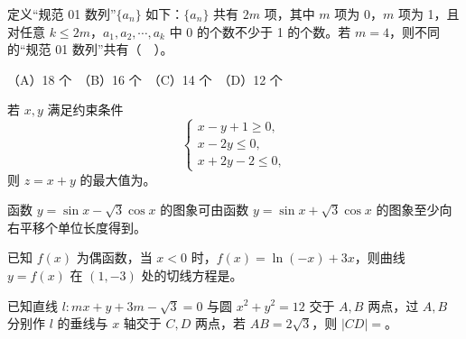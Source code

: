 \begin{question}
定义“规范 01 数列”\(\{a_n\}\) 如下：\(\{a_n\}\) 共有 \(2m\) 项，其中 \(m\) 项为 0，\(m\) 项为 1，且对任意 \(k\leq 2m\)，\(a_1,a_2,\cdots,a_k\) 中 0 的个数不少于 1 的个数。若 \(m=4\)，则不同的“规范 01 数列”共有（　）。

（A）18 个　（B）16 个　（C）14 个　（D）12 个

\end{question}

\begin{question}
若 \(x,y\) 满足约束条件
\nopagebreak[4]
\[
\begin{cases}
x-y+1\geq0,\\
x-2y\leq0,\\
x+2y-2\leq0,
\end{cases}
\]
则 \(z=x+y\) 的最大值为\gkblank{}。

\end{question}
\begin{question}
函数 \(y=\sin x-\sqrt3\cos x\) 的图象可由函数 \(y=\sin x+\sqrt3\cos x\) 的图象至少向右平移\gkblank{}个单位长度得到。

\end{question}
\begin{question}
已知 \(f(x)\) 为偶函数，当 \(x<0\) 时，\(f(x)=\ln(-x)+3x\)，则曲线 \(y=f(x)\) 在 \((1,-3)\) 处的切线方程是\gkblank{}。

\end{question}
\begin{question}
已知直线 \(l:mx+y+3m-\sqrt3=0\) 与圆 \(x^2+y^2=12\) 交于 \(A,B\) 两点，过 \(A,B\) 分别作 \(l\) 的垂线与 \(x\) 轴交于 \(C,D\) 两点，若 \(AB=2\sqrt3\)，则 \(|CD|=\)\gkblank{}。

\end{question}

